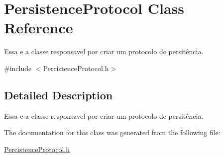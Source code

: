 \hypertarget{class_persistence_protocol}{\section{Persistence\-Protocol Class Reference}
\label{class_persistence_protocol}
}


Essa e a classe responsavel por criar um protocolo de persitência.  




{\ttfamily \#include $<$Percistence\-Protocol.\-h$>$}



\subsection{Detailed Description}
Essa e a classe responsavel por criar um protocolo de persitência. 

The documentation for this class was generated from the following file\-:\begin{DoxyCompactItemize}
\item 
\hyperlink{_percistence_protocol_8h}{Percistence\-Protocol.\-h}\end{DoxyCompactItemize}

